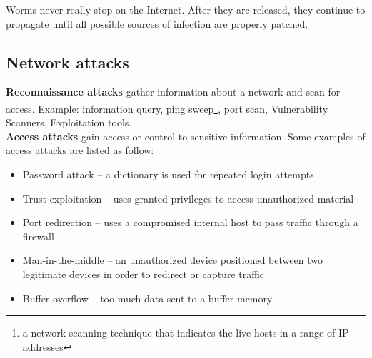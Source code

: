 \note Worms never really stop on the Internet. After they are released, they continue to propagate until all possible sources of infection are properly patched.\\

%

\subsection{Network attacks}


\textbf{Reconnaissance attacks} gather information about a network and scan for access. Example: information query, ping sweep\footnote{a network scanning technique that indicates the live hosts in a range of IP addresses},  port scan,  Vulnerability Scanners,  Exploitation tools.\\

\textbf{Access attacks} gain access or control to sensitive information. Some examples of access attacks are listed as follow:\\

\begin{itemize}
\item Password attack -- a dictionary is used for repeated login attempts
\item Trust exploitation -- uses granted privileges to access unauthorized material
\item Port redirection -- uses a compromised internal host to pass traffic through a firewall
\item Man-in-the-middle -- an unauthorized device positioned between two legitimate devices in order to redirect or capture traffic
\item Buffer overflow -- too much data sent to a buffer memory
\end{itemize}

